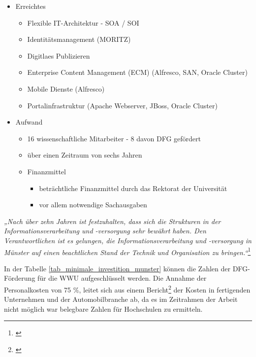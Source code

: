 \begin{itemize}
	\item Erreichtes
	\begin{itemize}
		\item Flexible IT-Architektur - SOA / SOI
		\item Identitätsmanagement (MORITZ)
		\item Digitlaes Publizieren
		\item Enterprise Content Management (ECM) (Alfresco, SAN, Oracle Cluster)
		\item Mobile Dienste (Alfresco)
		\item Portalinfrastruktur (Apache Webserver, JBoss, Oracle Cluster)
	\end{itemize}
\end{itemize}

		
\begin{itemize}	
	\item Aufwand
	\begin{itemize}
		\item 16 wissenschaftliche Mitarbeiter - 8 davon DFG gefördert
		\item über einen Zeitraum von sechs Jahren
		\item Finanzmittel
		\begin{itemize}
			\item beträchtliche Finanzmittel durch das Rektorat der Universität
			\item vor allem notwendige Sachausgaben
		\end{itemize}
	\end{itemize}
\end{itemize}

\textit{„Nach über zehn Jahren ist festzuhalten, dass sich die Strukturen in der Informationsverarbeitung und -versorgung sehr bewährt haben. Den Verantwortlichen ist es gelungen, die Informationsverarbeitung und -versorgung in Münster auf einen beachtlichen Stand der Technik und Organisation zu bringen.“}\footnote{\cite{bode_informationsmanagement_2010}}

In der Tabelle \ref{tab_minimale_investition_munster} können die Zahlen der DFG-Förderung für die WWU aufgeschlüsselt werden.
Die Annahme der Personalkosten von 75 \%, leitet sich aus einem Bericht\footnote{\autocite{schuelein_2009}} der Kosten in fertigenden Unternehmen und der Automobilbranche ab, da es im Zeitrahmen der Arbeit nicht möglich war belegbare Zahlen für Hochschulen zu ermitteln.


